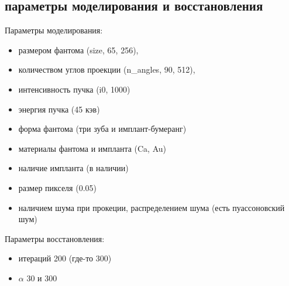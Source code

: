 \subsection{параметры моделирования и восстановления} \label{sect_2_3}
Параметры моделирования:
\begin{itemize}
  \item размером фантома (size, 65, 256),
  \item количеством углов проекции (n\_angles, 90, 512), 
  \item интенсивность пучка (i0, 1000)
  \item энергия пучка (45 кэв)
  \item форма фантома (три зуба и имплант-бумеранг)
  \item материалы фантома и импланта (Ca, Au)
  \item наличие импланта (в наличии)
  \item размер пикселя (0.05)
  \item наличием шума при прокеции, распределением шума (есть пуассоновский шум)
\end{itemize}

Параметры восстановления:
\begin{itemize}
  \item итераций 200 (где-то 300)
  \item $\alpha$ 30 и 300
\end{itemize}